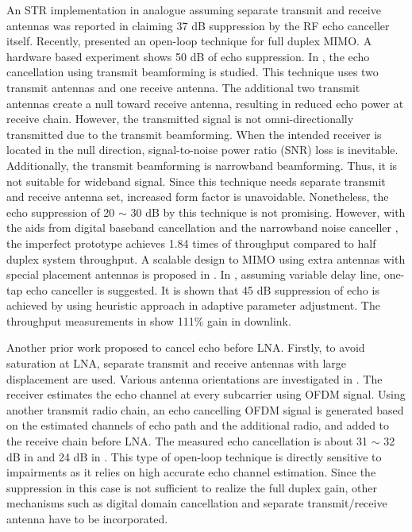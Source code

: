 \documentclass[twocolumn]{IEEEtran}
\begin{document}
An STR implementation in analogue assuming separate transmit and
receive antennas was reported in \cite{str1998} claiming 37 dB
suppression by the RF echo canceller itself. Recently,
\cite{str2012} presented an open-loop technique for full duplex
MIMO. A hardware based experiment shows 50 dB of echo suppression.
In \cite{stanford}, the echo cancellation using transmit beamforming
is studied. This technique uses two transmit antennas and one
receive antenna. The additional two transmit antennas create a null
toward receive antenna, resulting in reduced echo power at receive
chain. However, the transmitted signal is not omni-directionally
transmitted due to the transmit beamforming. When the intended
receiver is located in the null direction, signal-to-noise power
ratio (SNR) loss is inevitable. Additionally, the transmit
beamforming is narrowband beamforming. Thus, it is not suitable for
wideband signal. Since this technique needs separate transmit and
receive antenna set, increased form factor is unavoidable.
Nonetheless, the echo suppression of 20 $\sim$ 30 dB by this
technique is not promising. However, with the aids from digital
baseband cancellation and the narrowband noise canceller
\cite{narrow}, the imperfect prototype achieves 1.84 times of
throughput compared to half duplex system throughput. A scalable
design to MIMO using extra antennas with special placement antennas
is proposed in \cite{midu}. In \cite{mac2}, assuming variable delay
line, one-tap echo canceller is suggested. It is shown that 45 dB
suppression of echo is achieved by using heuristic approach in
adaptive parameter adjustment. The throughput measurements in
\cite{mac2} show 111\% gain in downlink.

Another prior work \cite{rice1} proposed to cancel echo before LNA.
Firstly, to avoid saturation at LNA, separate transmit and receive
antennas with large displacement are used. Various antenna
orientations are investigated in \cite{rice2}. The receiver
estimates the echo channel at every subcarrier using OFDM signal.
Using another transmit radio chain, an echo cancelling OFDM signal
is generated based on the estimated channels of echo path and the
additional radio, and added to the receive chain before LNA. The
measured echo cancellation is about 31 $\sim$ 32 dB in \cite{rice1}
and 24 dB in \cite{rice2}. This type of open-loop technique is
directly sensitive to impairments as it relies on high accurate echo
channel estimation. Since the suppression in this case is not
sufficient to realize the full duplex gain, other mechanisms such as
digital domain cancellation and separate transmit/receive antenna
have to be incorporated.
\end{document}
